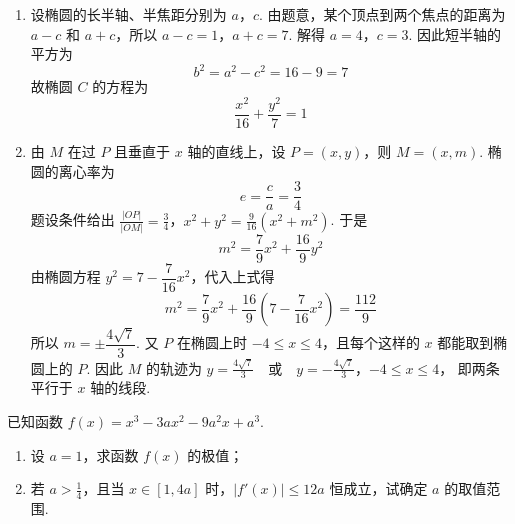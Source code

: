 \begin{solution}
\begin{enumerate}
\item 设椭圆的长半轴、半焦距分别为 \(a\)，\(c\). 由题意，某个顶点到两个焦点的距离为 \(a-c\) 和 \(a+c\)，所以
\(a-c=1\)，\(a+c=7\).
解得 \(a=4\)，\(c=3\). 因此短半轴的平方为
\[
b^2=a^2-c^2=16-9=7
\]
故椭圆 \(C\) 的方程为
\[
\frac{x^2}{16}+\frac{y^2}{7}=1
\]

\item 由 \(M\) 在过 \(P\) 且垂直于 \(x\) 轴的直线上，设 \(P=(x,y)\)，则 \(M=(x,m)\). 椭圆的离心率为
\[
e=\frac{c}{a}=\frac34
\]
题设条件给出
\(\frac{|OP|}{|OM|}=\frac34\)，\(x^2+y^2=\frac{9}{16}(x^2+m^2)\).
于是
\[
m^2=\frac79x^2+\frac{16}{9}y^2
\]
由椭圆方程 \(y^2=7-\dfrac{7}{16}x^2\)，代入上式得
\[
m^2=\frac79x^2+\frac{16}{9}\left(7-\frac{7}{16}x^2\right)=\frac{112}{9}
\]
所以 \(m=\pm\dfrac{4\sqrt7}{3}\). 又 \(P\) 在椭圆上时 \(-4\leqslant x\leqslant4\)，且每个这样的 \(x\) 都能取到椭圆上的 \(P\). 因此 \(M\) 的轨迹为
\(y=\frac{4\sqrt7}{3}\quad\text{或}\quad y=-\frac{4\sqrt7}{3}\)，\(-4\leqslant x\leqslant4\)，
即两条平行于 \(x\) 轴的线段.
\end{enumerate}
\end{solution}

\begin{problem}
已知函数 \( f(x) = x^3 - 3ax^2 - 9a^2x + a^3 \).

\begin{enumerate}
\item 设 \(a = 1\)，求函数 \(f(x)\) 的极值；
\item 若 \(a > \frac{1}{4}\)，且当 \(x \in [1, 4a]\) 时，\(|f'(x)| \leqslant 12a\) 恒成立，试确定 \(a\) 的取值范围.
\end{enumerate}
\end{problem}

